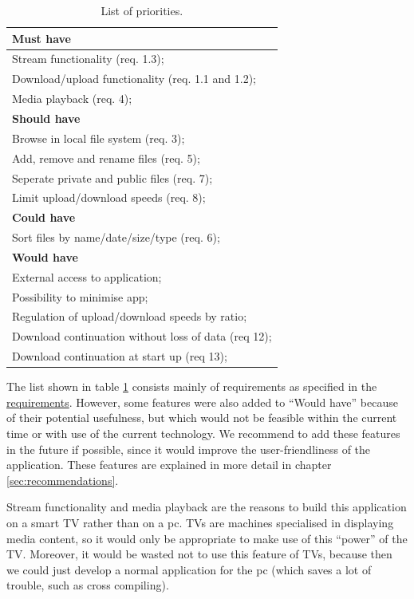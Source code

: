 \begin{table}[h!]
\centering
\begin{tabular}{|l|}
\hline
\textbf{Must have}\\ \hline
Stream functionality (req. 1.3); \\
Download/upload functionality (req. 1.1 and 1.2); \\
Media playback (req. 4); \\ \hline

\textbf{Should have}\\ \hline
Browse in local file system (req. 3); \\
Add, remove and rename files (req. 5); \\
Seperate private and public files (req. 7); \\
Limit upload/download speeds (req. 8); \\ \hline

\textbf{Could have}\\ \hline
Sort files by name/date/size/type (req. 6); \\ \hline

\textbf{Would have}\\ \hline
External access to application; \\
Possibility to minimise app; \\
Regulation of upload/download speeds by ratio; \\
Download continuation without loss of data (req 12); \\
Download continuation at start up (req 13); \\ \hline
\end{tabular}
\caption{List of priorities.}
\label{tab:MosCoW}
\end{table}

The list shown in table \ref{tab:MosCoW} consists mainly of requirements as specified in the 
\hyperref[sec:requirements]{requirements}.
However, some features were also added to ``Would have'' because of their potential usefulness, but which would
not be feasible within the current time or with use of the current technology. We recommend to add these features in the future if possible,
 since it would improve the user-friendliness of the application. These features are explained in more detail in chapter \hyperref[sec:recommendations]{\ref{sec:recommendations}}.

Stream functionality and media playback are the reasons to build this application on a smart TV rather than on a pc.
TV\textquotesingle s are machines specialised in displaying media content, so it would only be appropriate to make use of this ``power'' of the TV.
Moreover, it would be wasted not to use this feature of TV\textquotesingle s, because then we could just develop a normal application for the pc (which saves a lot of trouble, such as cross compiling).

